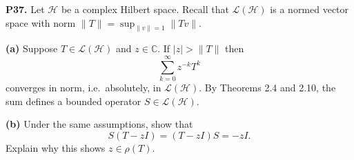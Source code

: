 \documentclass[12pt]{amsart}
\newcommand{\cH}{\mathcal{H}}
\newcommand{\cL}{\mathcal{L}}
\newcommand{\CC}{\mathbb{C}}
\newcommand{\prob}[1]{\bigskip\noindent\textbf{#1.}\quad }
\newcommand{\epart}[1]{\medskip\noindent\textbf{(#1)}\quad }
\begin{document}
\prob{P37}  Let $\cH$ be a complex Hilbert space.  Recall that $\cL(\cH)$ is a normed vector space with norm $\|T\| = \sup_{\|v\|=1} \|Tv\|$.

\epart{a}  Suppose $T\in\cL(\cH)$ and $z\in\CC$.  If $|z| > \|T\|$ then
	$$\sum_{k=0}^\infty z^{-k} T^k$$
converges in norm, i.e.~absolutely, in $\cL(\cH)$.  By Theorems 2.4 and 2.10, the sum defines a bounded operator $S \in \cL(\cH)$.

\epart{b}  Under the same assumptions, show that
	$$S (T-z I) = (T-z I) S = - z I.$$
Explain why this shows $z \in \rho(T)$.



\end{document}
